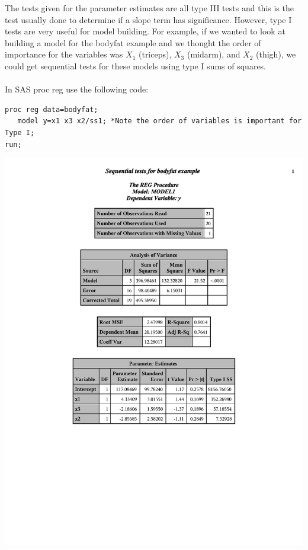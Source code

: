 \newpage

The tests given for the parameter estimates are all type III tests and this is the test usually done to determine if a slope term has significance.  However, type I tests are very useful for model building.  For example, if we wanted to look at building a model for the bodyfat example and we thought the order of importance for the variables was $X_1$ (triceps), $X_3$ (midarm), and $X_2$ (thigh), we could get sequential tests for these models using type I sums of squares.\\~\\ 

In SAS proc reg use the following code:\\
\begin{small}
\begin{verbatim}
proc reg data=bodyfat;
   model y=x1 x3 x2/ss1; *Note the order of variables is important for Type I;  
run;
\end{verbatim}
\end{small}

\begin{center}
\includegraphics[page=1,scale=0.7,trim= 10mm 70mm 10mm 10mm]{bodyfatexampletypeI}
\end{center}


